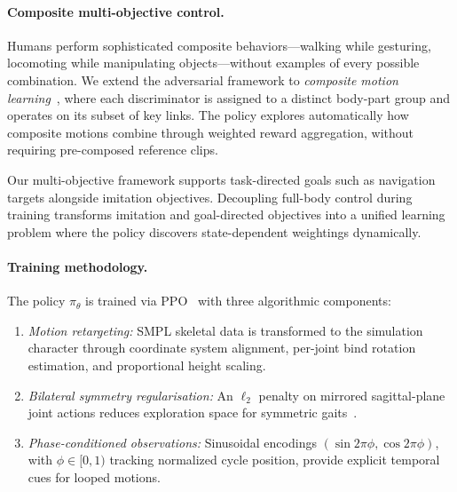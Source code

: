 \paragraph{Composite multi-objective control.}
Humans perform sophisticated composite behaviors---walking while gesturing, locomoting while manipulating objects---without examples of every possible combination. We extend the adversarial framework to \emph{composite motion learning}~\cite{composite2023}, where each discriminator is assigned to a distinct body-part group and operates on its subset of key links. The policy explores automatically how composite motions combine through weighted reward aggregation, without requiring pre-composed reference clips.

Our multi-objective framework supports task-directed goals such as navigation targets alongside imitation objectives. Decoupling full-body control during training transforms imitation and goal-directed objectives into a unified learning problem where the policy discovers state-dependent weightings dynamically.

\paragraph{Training methodology.}
The policy $\pi_\theta$ is trained via PPO~\cite{ppo2017} with three algorithmic components:

\begin{enumerate}
    \item \emph{Motion retargeting:} SMPL skeletal data is transformed to the simulation character through coordinate system alignment, per-joint bind rotation estimation, and proportional height scaling.
    \item \emph{Bilateral symmetry regularisation:} An $\ell_2$ penalty on mirrored sagittal-plane joint actions reduces exploration space for symmetric gaits~\cite{symlocom2018}.
    \item \emph{Phase-conditioned observations:} Sinusoidal encodings $(\sin 2\pi\phi, \cos 2\pi\phi)$, with $\phi \in [0,1)$ tracking normalized cycle position, provide explicit temporal cues for looped motions.
\end{enumerate}

